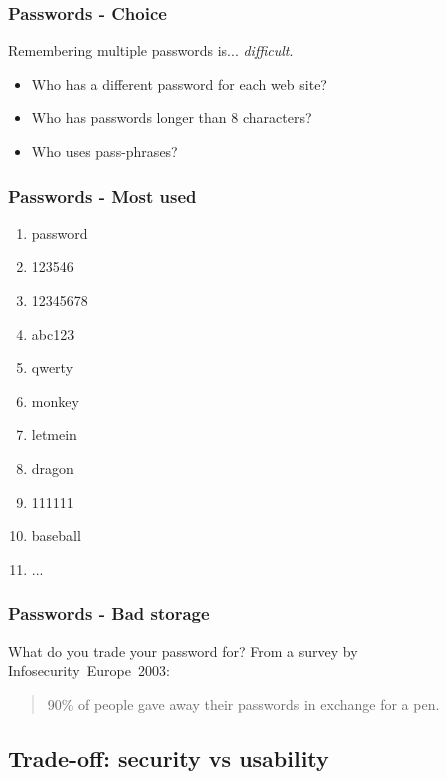 \begin{frame}
\frametitle{Passwords - Choice}
Remembering multiple passwords is... \emph{difficult}.
\begin{itemize}
\item Who has a different password for each web site?
\item Who has passwords longer than 8 characters?
\item Who uses pass-phrases?
\end{itemize}
\end{frame}

\begin{frame}
\frametitle{Passwords - Most used}
\begin{scriptsize}
\begin{enumerate}
\item password
\item 123546
\item 12345678
\item abc123
\item qwerty
\item monkey
\item letmein
\item dragon
\item 111111
\item baseball
\item ...
\end{enumerate}
\end{scriptsize}
\end{frame}

\begin{frame}
\frametitle{Passwords - Bad storage}
\end{frame}

\begin{frame}
\begin{exampleblock}{What do you trade your password for?}
From a survey by Infosecurity~Europe~2003:
\begin{quote}
90\% of people gave away their passwords in exchange for a pen.
\end{quote}
\end{exampleblock}
\end{frame}

\subsection{Trade-off: security vs usability}


